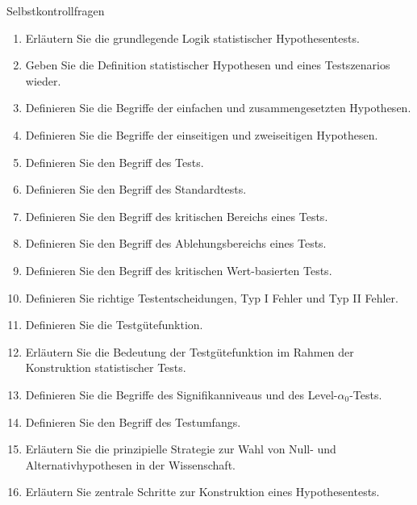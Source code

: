 \documentclass[
  8pt,
  ignorenonframetext,
]{beamer}
\providecommand{\tightlist}{%
  \setlength{\itemsep}{0pt}\setlength{\parskip}{0pt}}
\begin{document}
\begin{frame}{Selbstkontrollfragen}
\protect\hypertarget{selbstkontrollfragen}{}
\footnotesize

\begin{enumerate}
\tightlist
\item
  Erläutern Sie die grundlegende Logik statistischer Hypothesentests.
\item
  Geben Sie die Definition statistischer Hypothesen und eines
  Testszenarios wieder.
\item
  Definieren Sie die Begriffe der einfachen und zusammengesetzten
  Hypothesen.
\item
  Definieren Sie die Begriffe der einseitigen und zweiseitigen
  Hypothesen.
\item
  Definieren Sie den Begriff des Tests.
\item
  Definieren Sie den Begriff des Standardtests.
\item
  Definieren Sie den Begriff des kritischen Bereichs eines Tests.
\item
  Definieren Sie den Begriff des Ablehungsbereichs eines Tests.
\item
  Definieren Sie den Begriff des kritischen Wert-basierten Tests.
\item
  Definieren Sie richtige Testentscheidungen, Typ I Fehler und Typ II
  Fehler.
\item
  Definieren Sie die Testgütefunktion.
\item
  Erläutern Sie die Bedeutung der Testgütefunktion im Rahmen der
  Konstruktion statistischer Tests.
\item
  Definieren Sie die Begriffe des Signifikanniveaus und des
  Level-\(\alpha_0\)-Tests.
\item
  Definieren Sie den Begriff des Testumfangs.
\item
  Erläutern Sie die prinzipielle Strategie zur Wahl von Null- und
  Alternativhypothesen in der Wissenschaft.
\item
  Erläutern Sie zentrale Schritte zur Konstruktion eines
  Hypothesentests.
\end{enumerate}
\end{frame}
\end{document}
